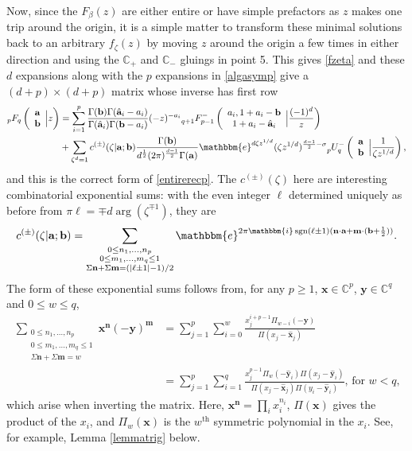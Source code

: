 \documentclass[12pt]{article}
\newcommand{\ee}[0] {\mathbbm{e}}
\newcommand{\ii}[0] {\mathbbm{i}}
\numberwithin{equation}{section}
\newcommand{\FF}[6] {{}_{#1}{#2}_{#3} \left( \begin{array}{c} #4 \\ #5 \end{array} \Big| {#6}  \right)}
\newcommand{\FFe}[7] {{}_{#1}^{\,}{#2}_{#3}^{#4} \left( \begin{array}{c} #5 \\ #6 \end{array} \Big| {#7} \right)}
\newcommand{\bfa}[0] {\mathbf{a}}
\newcommand{\bfb}[0] {\mathbf{b}}
\newcommand{\bfm}[0] {\mathbf{m}}
\newcommand{\bfn}[0] {\mathbf{n}}
\newcommand{\bfx}[0] {\mathbf{x}}
\newcommand{\bfy}[0] {\mathbf{y}}
\begin{document}
Now, since the $F_{\beta}(z)$ are either entire or have simple prefactors as $z$ makes one trip around the origin, it is a simple matter to transform these minimal solutions back to an arbitrary $f_{\zeta}(z)$ by moving $z$ around the origin a few times in either direction and using the $\mathbb{C}_{+}$ and $\mathbb{C}_{-}$ gluings in point 5. This gives \eqref{fzeta} and these $d$ expansions along with the $p$ expansions in \eqref{algasymp} give a $(d+p)\times(d+p)$ matrix whose inverse has first row
\begin{equation}
\label{entirerecp2}
\begin{alignedat}{1}
\FF{p}{F}{q}{\mathbf{a}}{\mathbf{b}}{z}&=\sum_{i=1}^{p} \frac{\Gamma(\mathbf{b}) \Gamma(\hat{\mathbf{a}}_i-a_i)}{\Gamma(\hat{\mathbf{a}}_i)\Gamma(\mathbf{b}-a_i)} (-z)^{-a_i} \FFe{q+1}{F}{p-1}{-}{a_i,1+a_i-\mathbf{b}}{1+a_i-\hat{\mathbf{a}}_i}{\frac{(-1)^d}{z}}\\
&+\sum_{\zeta^d=1} c^{(\pm)} (\zeta |\bfa; \bfb) \frac{\Gamma(\mathbf{b})}{d^{\frac{1}{2}} (2 \pi )^{\frac{d-1}{2}} \Gamma(\mathbf{a})} \ee^{d \zeta z^{1/d}}(\zeta z^{1/d})^{\frac{d-1}{2}-\sigma} \FFe{p}{U}{q}{-}{\bfa}{\bfb}{\frac{1}{\zeta z^{1/d}}}\text{,}
\end{alignedat}
\end{equation}
and this is the correct form of \eqref{entirerecp}. The $c^{(\pm)}(\zeta)$ here are interesting combinatorial exponential sums: with the even integer $\ell$ determined uniquely as before from $\pi \ell = \mp d \arg(\zeta^{\mp1})$, they are
\begin{equation}
\label{equ_czeta}
c^{(\pm)} (\zeta |\bfa; \bfb) =\sum_{\substack{0 \le n_1, \dots, n_p \\ 0 \le m_1, \dots, m_q \le 1 \\ \Sigma \bfn + \Sigma \bfm = (|\ell \pm 1|-1)/2}}{ \ee^{2\pi \ii \operatorname{sgn}\left(\ell\pm 1\right) (\bfn \cdot \bfa + \mathbf{m} \cdot (\bfb + \frac{1}{2}))}}\text{.}
\end{equation}
The form of these exponential sums follows from, for any $p \ge 1$, $\bfx \in \mathbb{C}^p$, $\bfy \in \mathbb{C}^q$ and $0 \le w \le q$,
\begin{align*}
\sum_{\substack{0 \le n_1, \dots, n_p \\ 0 \le m_1, \dots, m_q \le 1 \\ \Sigma \bfn + \Sigma \bfm = w}}{ \bfx^\bfn (-\bfy)^\bfm} &= \sum_{j=1}^{p}\sum_{i=0}^{w} \frac{x_j^{i+p-1} \Pi_{w-i}(-\bfy)}{\Pi (x_j-\hat{\bfx}_j)}\\
&=\sum_{j=1}^{p} \sum_{i=1}^{q} \frac{x_j^{p-1} \Pi_w(-\hat{\bfy}_i) \Pi(x_j-\hat{\bfy}_i)}{\Pi(x_j - \hat{\bfx}_j) \Pi (y_i-\hat{\bfy}_i)}\text{, for } w < q\text{,}
\end{align*}
which arise when inverting the matrix. Here, $\bfx^{\bfn} = \prod_i x_i^{n_i}$, $\Pi(\bfx)$ gives the product of the $x_i$, and $\Pi_w(\bfx)$ is the $w^{\text{th}}$ symmetric polynomial in the $x_i$. See, for example, Lemma \ref{lemmatrig} below.
\end{document}
